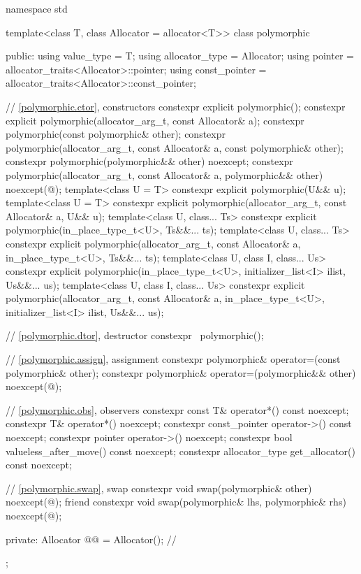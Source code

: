 %
\begin{codeblock}
namespace std {
  template<class T, class Allocator = allocator<T>>
  class polymorphic {
  public:
    using value_type = T;
    using allocator_type = Allocator;
    using pointer = allocator_traits<Allocator>::pointer;
    using const_pointer = allocator_traits<Allocator>::const_pointer;

    // \ref{polymorphic.ctor}, constructors
    constexpr explicit polymorphic();
    constexpr explicit polymorphic(allocator_arg_t, const Allocator& a);
    constexpr polymorphic(const polymorphic& other);
    constexpr polymorphic(allocator_arg_t, const Allocator& a, const polymorphic& other);
    constexpr polymorphic(polymorphic&& other) noexcept;
    constexpr polymorphic(allocator_arg_t, const Allocator& a, polymorphic&& other)
      noexcept(@\seebelow@);
    template<class U = T>
      constexpr explicit polymorphic(U&& u);
    template<class U = T>
      constexpr explicit polymorphic(allocator_arg_t, const Allocator& a, U&& u);
    template<class U, class... Ts>
      constexpr explicit polymorphic(in_place_type_t<U>, Ts&&... ts);
    template<class U, class... Ts>
      constexpr explicit polymorphic(allocator_arg_t, const Allocator& a,
                                     in_place_type_t<U>, Ts&&... ts);
    template<class U, class I, class... Us>
      constexpr explicit polymorphic(in_place_type_t<U>, initializer_list<I> ilist, Us&&... us);
    template<class U, class I, class... Us>
      constexpr explicit polymorphic(allocator_arg_t, const Allocator& a,
                                     in_place_type_t<U>, initializer_list<I> ilist, Us&&... us);

    // \ref{polymorphic.dtor}, destructor
    constexpr ~polymorphic();

    // \ref{polymorphic.assign}, assignment
    constexpr polymorphic& operator=(const polymorphic& other);
    constexpr polymorphic& operator=(polymorphic&& other) noexcept(@\seebelow@);

    // \ref{polymorphic.obs}, observers
    constexpr const T& operator*() const noexcept;
    constexpr T& operator*() noexcept;
    constexpr const_pointer operator->() const noexcept;
    constexpr pointer operator->() noexcept;
    constexpr bool valueless_after_move() const noexcept;
    constexpr allocator_type get_allocator() const noexcept;

    // \ref{polymorphic.swap}, swap
    constexpr void swap(polymorphic& other) noexcept(@\seebelow@);
    friend constexpr void swap(polymorphic& lhs, polymorphic& rhs) noexcept(@\seebelow@);

  private:
    Allocator @@ = Allocator();      // \expos
  };
}
\end{codeblock}

